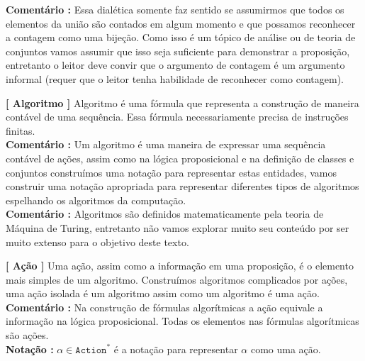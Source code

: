 \documentclass[10pt,a4paper]{report}
\begin{document}
\textbf{Comentário :} Essa dialética somente faz sentido se assumirmos que todos os elementos da união são contados em algum momento e que possamos reconhecer a contagem como uma bijeção. Como isso é um tópico de análise ou de teoria de conjuntos vamos assumir que isso seja suficiente para demonstrar a proposição, entretanto o leitor deve convir que o argumento de contagem é um argumento informal (requer que o leitor tenha habilidade de reconhecer como contagem).

\hspace{\baselineskip}

\textbf{[ Algoritmo ]} Algoritmo é uma fórmula que representa a construção de maneira contável de uma sequência. Essa fórmula necessariamente precisa de instruções finitas.\\

\textbf{Comentário :} Um algoritmo é uma maneira de expressar uma sequência contável de ações, assim como na lógica proposicional e na definição de classes e conjuntos construímos uma notação para representar estas entidades, vamos construir uma notação apropriada para representar diferentes tipos de algoritmos espelhando os algoritmos da computação.\\

\textbf{Comentário :} Algoritmos são definidos matematicamente pela teoria de Máquina de Turing, entretanto não vamos explorar muito seu conteúdo por ser muito extenso para o objetivo deste texto.

\hspace{\baselineskip}

\textbf{[ Ação ]} Uma ação, assim como a informação em uma proposição, é o elemento mais simples de um algoritmo. Construímos algoritmos complicados por ações, uma ação isolada é um algoritmo assim como um algoritmo é uma ação.\\

\textbf{Comentário :} Na construção de fórmulas algorítmicas a ação equivale a informação na lógica proposicional. Todas os elementos nas fórmulas algorítmicas são ações.\\

\textbf{Notação :} $ \alpha \in \texttt{Action}^* $ é a notação para representar $\alpha$ como uma ação.\\
\end{document}
